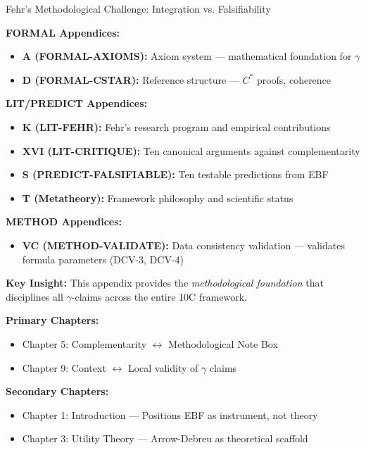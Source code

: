 \begin{chapter}{Fehr's Methodological Challenge: Integration vs. Falsifiability}
\begin{tcolorbox}[colback=blue!5!white,colframe=blue!75!black,title=\textbf{Cross-Reference Map}]
\textbf{FORMAL Appendices:}
\begin{itemize}[noitemsep]
    \item \textbf{A (FORMAL-AXIOMS):} Axiom system --- mathematical foundation for $\gamma$
    \item \textbf{D (FORMAL-CSTAR):} Reference structure --- $C^*$ proofs, coherence
\end{itemize}

\textbf{LIT/PREDICT Appendices:}
\begin{itemize}[noitemsep]
    \item \textbf{K (LIT-FEHR):} Fehr's research program and empirical contributions
    \item \textbf{XVI (LIT-CRITIQUE):} Ten canonical arguments against complementarity
    \item \textbf{S (PREDICT-FALSIFIABLE):} Ten testable predictions from EBF
    \item \textbf{T (Metatheory):} Framework philosophy and scientific status
\end{itemize}

\textbf{METHOD Appendices:}
\begin{itemize}[noitemsep]
    \item \textbf{VC (METHOD-VALIDATE):} Data consistency validation --- validates formula parameters (DCV-3, DCV-4)
\end{itemize}

\textbf{Key Insight:} This appendix provides the \textit{methodological foundation} that disciplines all $\gamma$-claims across the entire 10C framework.
\end{tcolorbox}

\begin{tcolorbox}[colback=purple!5!white, colframe=purple!75!black,
    title=Chapter Linkage]

\textbf{Primary Chapters:}
\begin{itemize}[nosep]
\item Chapter 5: Complementarity $\leftrightarrow$ Methodological Note Box
\item Chapter 9: Context $\leftrightarrow$ Local validity of $\gamma$ claims
\end{itemize}

\textbf{Secondary Chapters:}
\begin{itemize}[nosep]
\item Chapter 1: Introduction --- Positions EBF as instrument, not theory
\item Chapter 3: Utility Theory --- Arrow-Debreu as theoretical scaffold
\end{itemize}


\end{tcolorbox}
\end{chapter}
